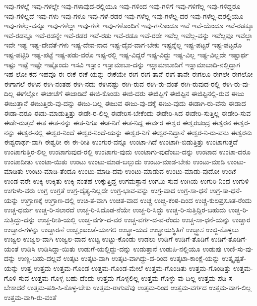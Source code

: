 {ಇವು-ಗಳಲ್ಲೆ
ಇವು-ಗಳಲ್ಲೇ
ಇವು-ಗಳಾವುದ-ರಲ್ಲಿಯೂ
ಇವು-ಗಳಿಂದ
ಇವು-ಗಳಿಗೆ
ಇವು-ಗಳಿಗೆಲ್ಲ
ಇವು-ಗಳಿದ್ದರೂ
ಇವು-ಗಳಿಲ್ಲದೆ
ಇವು-ಗಳು
ಇವು-ಗಳೂ
ಇವು-ಗಳೆ-ರಡರ
ಇವು-ಗಳೆಲ್ಲ
ಇವು-ಗಳೆಲ್ಲ-ದರ
ಇವು-ಗಳೆಲ್ಲ-ದರಲ್ಲಿಯೂ
ಇವು-ಗಳೆಲ್ಲ-ವನ್ನೂ
ಇವು-ಗಳೆಲ್ಲಾ
ಇವು-ಗಳೇ
ಇವು-ಗಳೊಂದಿಗೆ
ಇವು-ಗಳೊಂದೂ
ಇವೆ
ಇವೆ-ಯೆಂದೂ
ಇವೆ-ರಡಕ್ಕೂ
ಇವೆ-ರಡನ್ನೂ
ಇವೆ-ರಡನ್ನೇ
ಇವೆ-ರಡರ
ಇವೆ-ರಡು
ಇವೆ-ರಡೂ
ಇವೆ-ರಡೇ
ಇವೆಲ್ಲ
ಇವೆಲ್ಲ-ವನ್ನು
ಇವೆಲ್ಲವೂ
ಇವೆಲ್ಲಾ
ಇವೇ
ಇಷ್ಟ
ಇಷ್ಟ-ದೇವತೆ-ಗಳು
ಇಷ್ಟ-ದೇವ-ನಾದ
ಇಷ್ಟ-ದೈವ-ವಾಗ-ಬೇಕು
ಇಷ್ಟನ್ನೆಲ್ಲ
ಇಷ್ಟ-ಪಟ್ಟರೆ
ಇಷ್ಟ-ಪಟ್ಟರೊ
ಇಷ್ಟ-ಪಟ್ಟಿರಿ
ಇಷ್ಟ-ಪಟ್ಟೆ
ಇಷ್ಟ-ಪಡು-ವರೊ
ಇಷ್ಟ-ರಲ್ಲಿ
ಇಷ್ಟ-ವಿದ್ದರೆ
ಇಷ್ಟ-ವಿದ್ದು
ಇಷ್ಟ-ವಿಲ್ಲ
ಇಷ್ಟ-ವಿಲ್ಲದೇ
ಇಷ್ಟಾರ್ಥ
ಇಷ್ಟು
ಇಷ್ಟೆ
ಇಷ್ಟೇ
ಇಷ್ಟೊಂದು
ಇಸವಿ
ಇಸ್ಲಾಂ
ಇಸ್ಲಾಮಾಬಾ-ದನ್ನು
ಇಸ್ಲಾಮಾಬಾದಿಗೆ
ಇಸ್ಲಾಮಾಬಾದಿ-ನಲ್ಲಿದ್ದಾಗ
ಇಹ-ಲೋ-ಕದ
ಇಹವೂ
ಈ
ಈಕೆ
ಈಕೆ-ಯನ್ನು
ಈಕೆಯೇ
ಈಗ
ಈಗ-ತಾನೆ
ಈಗ-ತಾನೇ
ಈಗಲೂ
ಈಗಲೇ
ಈಗಲೋ
ಈಗಾಗಲೆ
ಈಗಿನ
ಈಗಿ-ನಂತಹ
ಈಗಿ-ನದು
ಈಗಿನಷ್ಟು
ಈಗಿ-ರುವ
ಈಗಿ-ರು-ವಂತೆ
ಈಗಿ-ರುವುದ-ರಲ್ಲಿ
ಈಗಿ-ರು-ವು-ದಿಲ್ಲ
ಈಗೆಲ್ಲೋ
ಈಚೀಚೆಗೆ
ಈಜಾಡಿದೆ
ಈಜಿ-ಕೊಂಡು
ಈಜಿ-ದರು
ಈಜಿಪ್ಟಿಗೆ
ಈಜಿಪ್ಟಿನ
ಈಜಿಪ್ಟಿನಲ್ಲಿ-ರುವ
ಈಜು
ಈಜುತ್ತಾನೆ
ಈಜುತ್ತಿರು-ವು-ದನ್ನು
ಈಜು-ಬಲ್ಲ
ಈಜುವ
ಈಜು-ವು-ದಕ್ಕೆ
ಈಜು-ವುದು
ಈಡಾಗಿ-ರು-ವೆನು
ಈಡಾದ
ಈಡಾ-ದರೂ
ಈಡು-ಮಾಡುತ್ತಿತ್ತು
ಈಡೇ-ರ-ಲಿಲ್ಲ
ಈಡೇರಿಸ-ಬೇಕೆಂದು
ಈಡೇರಿ-ಸಿದ
ಈಡೇರಿ-ಸುತ್ತಿಲ್ಲ
ಈಡೇರಿ-ಸುವ
ಈಡೇ-ರುತ್ತದೆ
ಈತ
ಈತ-ನನ್ನು
ಈತ-ನಿಗೂ
ಈತ-ನಿಗೆ
ಈತ-ನಿದ್ದ
ಈರ್ವರ
ಈಶ್ವರ
ಈಶ್ವರಚಂದ್ರ
ಈಶ್ವರನ
ಈಶ್ವರ-ನನ್ನು
ಈಶ್ವರ-ನಲ್ಲಿ
ಈಶ್ವರ-ನಿಂದೆ
ಈಶ್ವರ-ನಿಂದೆ-ಯನ್ನು
ಈಶ್ವರ-ನಿಗೆ
ಈಶ್ವರ-ನಿದ್ದಾನೆ
ಈಶ್ವರ-ನಿ-ರು-ವನು
ಈಶ್ವರನು
ಈಶ್ವರಾರ್ಥ-ವಾಗಿ
ಈಶ್ವರೀ
ಈ
ಈ-ರೀತಿ
ಉಂಗುರ-ವನ್ನೂ
ಉಂಟಾ-ಗಿದೆ
ಉಂಟಾಗಿ-ಬಿಡುತ್ತಿತ್ತು
ಉಂಟಾಗುತ್ತದೆ
ಉಂಟಾಗುತ್ತಿರ-ಲಿಲ್ಲ
ಉಂಟಾಗುವುದ-ರಲ್ಲಿ
ಉಂಟಾಗು-ವುದು
ಉಂಟಾಗು-ವುದೆಂಬು-ದನ್ನು
ಉಂಟಾದ
ಉಂಟಾ-ದರೂ
ಉಂಟಾದೀತು
ಉಂಟಾ-ಯಿತು
ಉಂಟು
ಉಂಟು-ಮಾಡ-ಬಲ್ಲುದು
ಉಂಟು-ಮಾಡ-ಬೇಕು
ಉಂಟು-ಮಾಡಿ
ಉಂಟು-ಮಾಡಿತು
ಉಂಟು-ಮಾಡಿ-ತೆಂದೂ
ಉಂಟು-ಮಾಡಿ-ದವು
ಉಂಟು-ಮಾಡುವ
ಉಂಟು-ಮಾಡು-ವುದೋ
ಉಂಟೆ
ಉಂಡ-ವರೇ
ಉಕ್ಕಿ
ಉಕ್ಕಿತು
ಉಕ್ಕಿ-ನಂತಹ
ಉಕ್ಕುತ್ತಿದ್ದ
ಉಗಮಸ್ಥಾನ
ಉಗಮಿ-ಸುವ
ಉಗಿಯ
ಉಗುರಿ-ನಿಂದ
ಉಗುಳಿ
ಉಗುಳು-ವರು
ಉಗ್ರ
ಉಗ್ರತೆ
ಉಗ್ರ-ದೈತ್ಯ-ನಿಲ್ಲದೇ
ಉಗ್ರ-ಭಾವ-ವನ್ನು
ಉಗ್ರ-ವಾದ
ಉಗ್ರ-ಸಾ-ಧನೆ
ಉಗ್ರ-ಸಾ-ಧನೆ-ಯನ್ನು
ಉಗ್ರಾಣಕ್ಕೆ
ಉಗ್ರಾಣ-ದಲ್ಲಿ
ಉಚಿ-ತ-ವಾಗಿ
ಉಚಿತ-ವಾದ
ಉಚ್ಚ
ಉಚ್ಚ-ಕಂಠ-ದಿಂದ
ಉಚ್ಚ-ಕುಲಪ್ರಸೂತ-ರೆಂದು
ಉಚ್ಚ-ಧರ್ಮ
ಉಚ್ಚ-ರಿ-ಸಲಾರದೆ
ಉಚ್ಚ-ರಿ-ಸಿದೊಡ-ನೆಯೇ
ಉಚ್ಚ-ರಿ-ಸಿದ್ದು
ಉಚ್ಚ-ರಿ-ಸುತ್ತಿದ್ದಿರ-ಬಹುದು
ಉಚ್ಚ-ರಿ-ಸುತ್ತಿದ್ದು-ದನ್ನು
ಉಚ್ಚ-ರೀತಿ-ಯಲ್ಲಿ
ಉಚ್ಚ-ವರ್ಗ-ದ-ವರ
ಉಚ್ಚ-ವರ್ಗ-ದ-ವ-ರೆಂದು
ಉಚ್ಚ-ಸಾ-ಧನೆ-ಯನ್ನು
ಉಚ್ಚಾರ
ಉಚ್ಚಾರ-ಗಳನ್ನು
ಉಚ್ಚಾರಣೆ
ಉಚ್ಛೃಂಖಲತೆ-ಯಾಗಲಿ
ಉಚ್ಛ್ರಾ-ಯದ
ಉಚ್ಛ್ರಾಯಸ್ಥಿತಿಗೆ
ಉಚ್ಛ್ವಾಸ
ಉಜ್ಜಿ-ಕೊಳ್ಳಲು
ಉಜ್ವಲ
ಉಜ್ವಲ-ವಾಗಿ
ಉಜ್ವಲ-ವಾದ
ಉಟ್ಟ
ಉಟ್ಟು-ಕೊಂಡು
ಉಡಲು
ಉಡಿಗೆ
ಉಡಿಗೆ-ತೊಡಿಗೆ
ಉಡಿಗೆ-ತೊಡಿಗೆ-ಯಂತೆ
ಉಡಿಸಿ
ಉಡಿಸಿದ್ದಾ-ಯಿತು
ಉಡುಗೆ-ಯಲ್ಲಿದ್ದು-ದನ್ನು
ಉಡುತ್ತಾನೆ
ಉಡುಪಿ-ನಲ್ಲಿಯೂ
ಉಡುಪು
ಉಣಿ-ಸು-ವು-ದನ್ನು
ಉಣ್ಣ-ಬಹು-ದಲ್ಲವೆ
ಉತ್ಕಟ
ಉತ್ಕಟ-ವಾಗಿ
ಉತ್ಕಟ-ವಾಗಿದ್ದು-ದ-ರಿಂದ
ಉತ್ಕಟಾ-ಕಾಂಕ್ಷೆ-ಯನ್ನು
ಉತ್ಕೃಷ್ಟತೆ-ಯನ್ನು
ಉತ್ತ
ಉತ್ತಮ
ಉತ್ತಮ-ಗೊಂಡ
ಉತ್ತಮ-ಗೊಂಡ-ಮೇಲೆ
ಉತ್ತಮ-ಗೊಂಡಿತು
ಉತ್ತಮ-ಗೊಂಡಿತ್ತು
ಉತ್ತಮ-ಗೊಳಿ-ಸುವ
ಉತ್ತಮ-ಗೊಳ್ಳ-ಬಹು-ದೆಂದು
ಉತ್ತಮ-ಗೊಳ್ಳಲಿಲ್ಲ
ಉತ್ತಮ-ಗೊಳ್ಳು-ವು-ದಿಲ್ಲ
ಉತ್ತಮ-ಪಡಿ-ಸ-ಬೇಕಾದರೆ
ಉತ್ತಮ-ಪಡಿ-ಸಿ-ಕೊಳ್ಳ-ಬೇಕು
ಉತ್ತಮ-ರಾಗುವೆವು
ಉತ್ತಮ-ರಿಂದ
ಉತ್ತಮ-ವರ್ಗದ
ಉತ್ತಮ-ವಾಗ-ಲಿಲ್ಲ
ಉತ್ತಮ-ವಾಗಿ-ರು-ವಂತೆ
}
